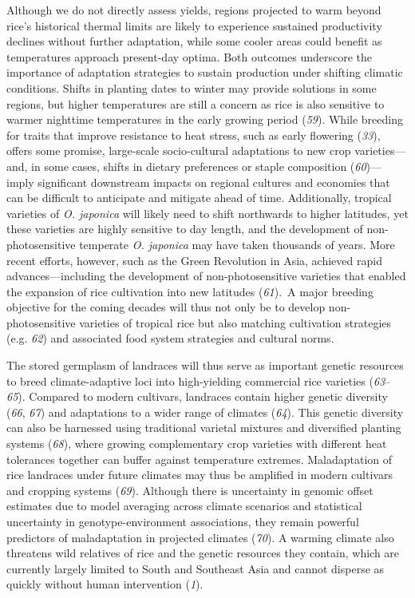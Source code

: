 \documentclass[
  letterpaper,
  DIV=11,
  numbers=noendperiod]{scrartcl}
\begin{document}
Although we do not directly assess yields, regions projected to warm
beyond rice's historical thermal limits are likely to experience
sustained productivity declines without further adaptation, while some
cooler areas could benefit as temperatures approach present-day optima.
Both outcomes underscore the importance of adaptation strategies to
sustain production under shifting climatic conditions. Shifts in
planting dates to winter may provide solutions in some regions, but
higher temperatures are still a concern as rice is also sensitive to
warmer nighttime temperatures in the early growing period (\emph{59}).
While breeding for traits that improve resistance to heat stress, such
as early flowering (\emph{33}), offers some promise, large-scale
socio-cultural adaptations to new crop varieties---and, in some cases,
shifts in dietary preferences or staple composition (\emph{60})---imply
significant downstream impacts on regional cultures and economies that
can be difficult to anticipate and mitigate ahead of time. Additionally,
tropical varieties of \emph{O. japonica} will likely need to shift
northwards to higher latitudes, yet these varieties are highly sensitive
to day length, and the development of non-photosensitive temperate
\emph{O. japonica} may have taken thousands of years. More recent
efforts, however, such as the Green Revolution in Asia, achieved rapid
advances---including the development of non-photosensitive varieties
that enabled the expansion of rice cultivation into new latitudes
(\emph{61}).~A major breeding objective for the coming decades will thus
not only be to develop non-photosensitive varieties of tropical rice but
also matching cultivation strategies (e.g. \emph{62}) and associated
food system strategies and cultural norms.

The stored germplasm of landraces will thus serve as important genetic
resources to breed climate-adaptive loci into high-yielding commercial
rice varieties (\emph{63}--\emph{65}). Compared to modern cultivars,
landraces contain higher genetic diversity (\emph{66}, \emph{67}) and
adaptations to a wider range of climates (\emph{64}). This genetic
diversity can also be harnessed using traditional varietal mixtures and
diversified planting systems (\emph{68}), where growing complementary
crop varieties with different heat tolerances together can buffer
against temperature extremes. Maladaptation of rice landraces under
future climates may thus be amplified in modern cultivars and cropping
systems (\emph{69}). Although there is uncertainty in genomic offset
estimates due to model averaging across climate scenarios and
statistical uncertainty in genotype-environment associations, they
remain powerful predictors of maladaptation in projected climates
(\emph{70}). A warming climate also threatens wild relatives of rice and
the genetic resources they contain, which are currently largely limited
to South and Southeast Asia and cannot disperse as quickly without human
intervention (\emph{1}).
\end{document}
